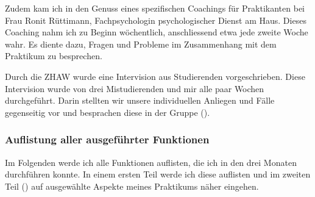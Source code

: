 Zudem kam ich in den Genuss eines spezifischen Coachings für Praktikanten bei Frau Ronit Rüttimann, Fachpsychologin psychologischer Dienst am Haus. Dieses Coaching nahm ich zu Beginn wöchentlich, anschliessend etwa jede zweite Woche wahr. Es diente dazu, Fragen und Probleme im Zusammenhang mit dem Praktikum zu besprechen.

Durch die ZHAW wurde eine Intervision aus Studierenden vorgeschrieben. Diese Intervision wurde von drei Mistudierenden und mir alle paar Wochen durchgeführt. Darin stellten wir unsere individuellen Anliegen und Fälle gegenseitig vor und besprachen diese in der Gruppe (). 

\subsubsection{Auflistung aller ausgeführter Funktionen}
Im Folgenden werde ich alle Funktionen auflisten, die ich in den drei Monaten durchführen konnte. In einem ersten Teil werde ich diese auflisten und im zweiten Teil () auf ausgewählte Aspekte meines Praktikums näher eingehen.
